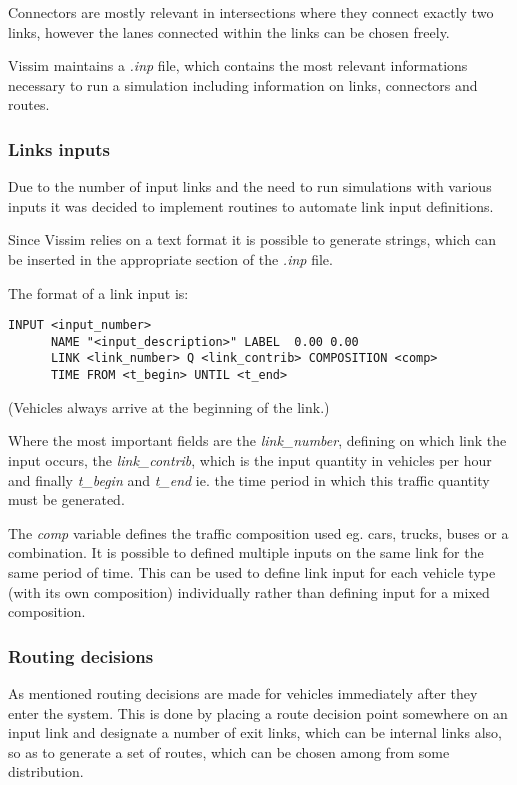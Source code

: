 \documentclass[10pt,a4paper]{article}
\begin{document}
Connectors are mostly relevant in intersections where they connect exactly two links, however the lanes connected within the links can be chosen freely.

Vissim maintains a \textit{.inp} file, which contains the most relevant informations necessary to run a simulation including information on links, connectors and routes. 

\subsubsection*{Links inputs}
Due to the number of input links and the need to run simulations with various inputs it was decided to implement routines to automate link input definitions.

Since Vissim relies on a text format it is possible to generate strings, which can be inserted in the appropriate section of the \textit{.inp} file.

The format of a link input is:
\begin{verbatim}
INPUT <input_number>
      NAME "<input_description>" LABEL  0.00 0.00
      LINK <link_number> Q <link_contrib> COMPOSITION <comp>
      TIME FROM <t_begin> UNTIL <t_end>
\end{verbatim}

(Vehicles always arrive at the beginning of the link.)

Where the most important fields are the \textit{link_number}, defining on which link the input occurs, the \textit{link_contrib}, which is the input quantity in vehicles per hour and finally \textit{t_begin} and \textit{t_end} ie. the time period in which this traffic quantity must be generated.

The \textit{comp} variable defines the traffic composition used eg. cars, trucks, buses or a combination. It is possible to defined multiple inputs on the same link for the same period of time. This can be used to define link input for each vehicle type (with its own composition) individually rather than defining input for a mixed composition.

\subsubsection*{Routing decisions}
As mentioned routing decisions are made for vehicles immediately after they enter the system. This is done by placing a route decision point somewhere on an input link and designate a number of exit links, which can be internal links also, so as to generate a set of routes, which can be chosen among from some distribution.
\end{document}
